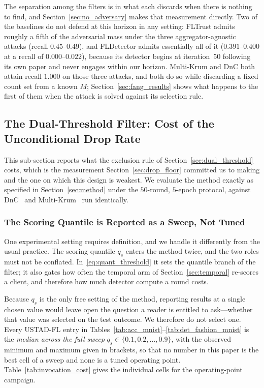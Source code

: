 \documentclass[journal]{IEEEtran}
\begin{document}
The separation among the filters is in what each discards when there is nothing to find, and Section~\ref{sec:no_adversary} makes that measurement directly. Two of the baselines do not defend at this horizon in any setting: FLTrust admits roughly a fifth of the adversarial mass under the three aggregator-agnostic attacks (recall $0.45$--$0.49$), and FLDetector admits essentially all of it ($0.391$--$0.400$ at a recall of $0.000$--$0.022$), because its detector begins at iteration~$50$ following its own paper and never engages within our horizon. Multi-Krum and DnC both attain recall $1.000$ on those three attacks, and both do so while discarding a fixed count set from a known $M$; Section~\ref{sec:fang_results} shows what happens to the first of them when the attack is solved against its selection rule.

\subsection{The Dual-Threshold Filter: Cost of the Unconditional Drop Rate}
\label{sec:af_results}

This sub-section reports what the exclusion rule of Section~\ref{sec:dual_threshold} costs, which is the measurement Section~\ref{sec:drop_floor} committed us to making and the one on which this design is weakest. We evaluate the method exactly as specified in Section~\ref{sec:method} under the $50$-round, $5$-epoch protocol, against DnC~\cite{shejwalkar2021manipulating} and Multi-Krum~\cite{blanchard2017machine} run identically.

\subsubsection{The Scoring Quantile is Reported as a Sweep, Not Tuned}
\label{sec:operating_point}
One experimental setting requires definition, and we handle it differently from the usual practice. The scoring quantile $q_s$ enters the method twice, and the two roles must not be conflated. In~\eqref{eq:quant_threshold} it sets the quantile branch of the filter; it also gates how often the temporal arm of Section~\ref{sec:temporal} re-scores a client, and therefore how much detector compute a round costs.

Because $q_s$ is the only free setting of the method, reporting results at a single chosen value would leave open the question a reader is entitled to ask---whether that value was selected on the test outcome. We therefore do not select one. Every USTAD-FL entry in Tables~\ref{tab:acc_mnist}--\ref{tab:det_fashion_mnist} is the \emph{median across the full sweep} $q_s \in \{0.1, 0.2, \dots, 0.9\}$, with the observed minimum and maximum given in brackets, so that no number in this paper is the best cell of a sweep and none is a tuned operating point. Table~\ref{tab:invocation_cost} gives the individual cells for the operating-point campaign.
\end{document}
